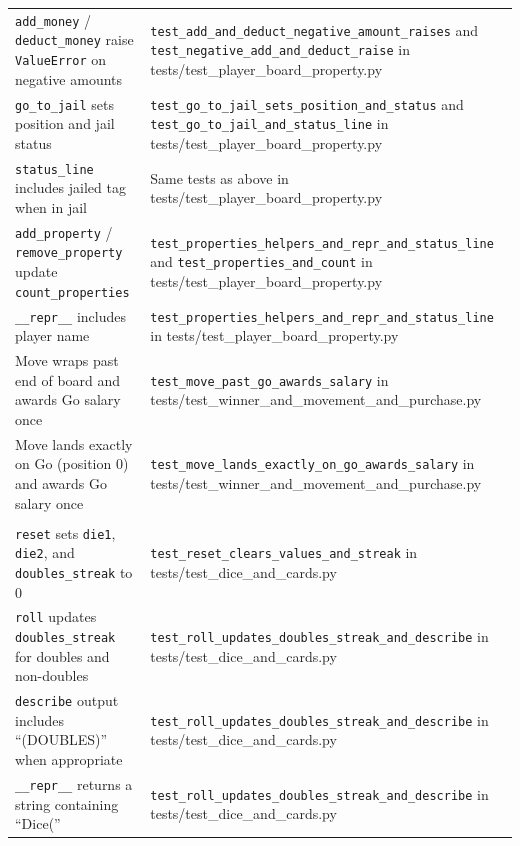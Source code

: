 \documentclass[11pt]{article}
\begin{document}
\begin{longtable}{>{\raggedright\arraybackslash}p{} >{\raggedright\arraybackslash}p{}}
\multicolumn{2}{l}{\textbf{moneypoly.player: Player helpers and move}} \\ \hline
\texttt{add\_money} / \texttt{deduct\_money} raise \texttt{ValueError} on negative amounts & \texttt{test\_add\_and\_deduct\_negative\_amount\_raises} and \texttt{test\_negative\_add\_and\_deduct\_raise} in tests/test\_player\_board\_property.py \\ \hline
\texttt{go\_to\_jail} sets position and jail status & \texttt{test\_go\_to\_jail\_sets\_position\_and\_status} and \texttt{test\_go\_to\_jail\_and\_status\_line} in tests/test\_player\_board\_property.py \\ \hline
\texttt{status\_line} includes jailed tag when in jail & Same tests as above in tests/test\_player\_board\_property.py \\ \hline
\texttt{add\_property} / \texttt{remove\_property} update \texttt{count\_properties} & \texttt{test\_properties\_helpers\_and\_repr\_and\_status\_line} and \texttt{test\_properties\_and\_count} in tests/test\_player\_board\_property.py \\ \hline
\texttt{\_\_repr\_\_} includes player name & \texttt{test\_properties\_helpers\_and\_repr\_and\_status\_line} in tests/test\_player\_board\_property.py \\ \hline
Move wraps past end of board and awards Go salary once & \texttt{test\_move\_past\_go\_awards\_salary} in tests/test\_winner\_and\_movement\_and\_purchase.py \\ \hline
Move lands exactly on Go (position 0) and awards Go salary once & \texttt{test\_move\_lands\_exactly\_on\_go\_awards\_salary} in tests/test\_winner\_and\_movement\_and\_purchase.py \\ \hline

\multicolumn{2}{l}{\textbf{moneypoly.dice: Dice}} \\ \hline
\texttt{reset} sets \texttt{die1}, \texttt{die2}, and \texttt{doubles\_streak} to 0 & \texttt{test\_reset\_clears\_values\_and\_streak} in tests/test\_dice\_and\_cards.py \\ \hline
\texttt{roll} updates \texttt{doubles\_streak} for doubles and non-doubles & \texttt{test\_roll\_updates\_doubles\_streak\_and\_describe} in tests/test\_dice\_and\_cards.py \\ \hline
\texttt{describe} output includes ``(DOUBLES)'' when appropriate & \texttt{test\_roll\_updates\_doubles\_streak\_and\_describe} in tests/test\_dice\_and\_cards.py \\ \hline
\texttt{\_\_repr\_\_} returns a string containing ``Dice('' & \texttt{test\_roll\_updates\_doubles\_streak\_and\_describe} in tests/test\_dice\_and\_cards.py \\ \hline


\end{longtable}
\end{document}
